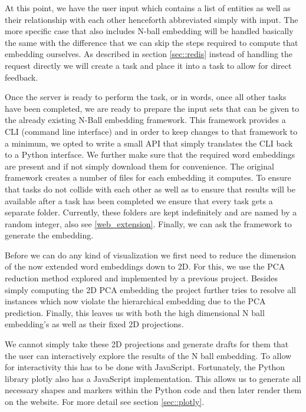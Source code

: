 At this point, we have the user input which contains a list of entities as well as their relationship with each other henceforth abbreviated simply with input. The more specific case that also includes N-ball embedding will be handled basically the same with the difference that we can skip the steps required to compute that embedding ourselves. As described in section \ref{sec::redis} instead of handling the request directly we will create a task and place it into a task to allow for direct feedback.  


Once the server is ready to perform the task, or in words, once all other tasks have been completed, we are ready to prepare the input sets that can be given to the already existing N-Ball embedding framework. This framework provides a CLI (command line interface) and in order to keep changes to that framework to a minimum, we opted to write a small API that simply translates the CLI back to a Python interface. We further make sure that the required word embeddings are present and if not simply download them for convenience. The original framework creates a number of files for each embedding it computes. To ensure that tasks do not collide with each other as well as to ensure that results will be available after a task has been completed we ensure that every task gets a separate folder. Currently, these folders are kept indefinitely and are named by a random integer, also see \ref{web_extension}. Finally, we can ask the framework to generate the embedding.

Before we can do any kind of visualization we first need to reduce the dimension of the now extended word embeddings down to 2D. For this, we use the PCA reduction method explored and implemented by a previous project. Besides simply computing the 2D PCA embedding the project further tries to resolve all instances which now violate the hierarchical embedding due to the PCA prediction. Finally, this leaves us with both the high dimensional N ball embedding's as well as their fixed 2D projections.

We cannot simply take these 2D projections and generate drafts for them that the user can interactively explore the results of the N ball embedding. To allow for interactivity this has to be done with JavaScript. Fortunately, the Python library plotly also has a JavaScript implementation. This allows us to generate all necessary shapes and markers within the Python code and then later render them on the website. For more detail see section \ref{sec::plotly}.



